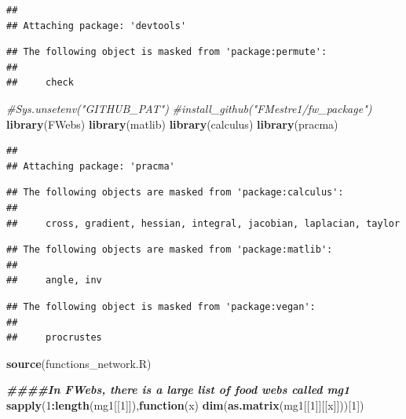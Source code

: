 \documentclass[
]{book}
\newenvironment{Shaded}{\begin{snugshade}}{\end{snugshade}}
\newcommand{\CommentTok}[1]{\textcolor[rgb]{0.56,0.35,0.01}{\textit{#1}}}
\newcommand{\ControlFlowTok}[1]{\textcolor[rgb]{0.13,0.29,0.53}{\textbf{#1}}}
\newcommand{\DecValTok}[1]{\textcolor[rgb]{0.00,0.00,0.81}{#1}}
\newcommand{\DocumentationTok}[1]{\textcolor[rgb]{0.56,0.35,0.01}{\textbf{\textit{#1}}}}
\newcommand{\FunctionTok}[1]{\textcolor[rgb]{0.13,0.29,0.53}{\textbf{#1}}}
\newcommand{\NormalTok}[1]{#1}
\newcommand{\SpecialCharTok}[1]{\textcolor[rgb]{0.81,0.36,0.00}{\textbf{#1}}}
\newcommand{\StringTok}[1]{\textcolor[rgb]{0.31,0.60,0.02}{#1}}
\theoremstyle{definition}
\theoremstyle{definition}
\theoremstyle{definition}
\theoremstyle{definition}
\theoremstyle{remark}
\begin{document}
\begin{verbatim}
## 
## Attaching package: 'devtools'
\end{verbatim}

\begin{verbatim}
## The following object is masked from 'package:permute':
## 
##     check
\end{verbatim}

\begin{Shaded}
\begin{Highlighting}[]
\CommentTok{\#Sys.unsetenv("GITHUB\_PAT")}
\CommentTok{\#install\_github("FMestre1/fw\_package")}
\FunctionTok{library}\NormalTok{(FWebs)}
\FunctionTok{library}\NormalTok{(matlib)}
\FunctionTok{library}\NormalTok{(calculus)}
\FunctionTok{library}\NormalTok{(pracma)}
\end{Highlighting}
\end{Shaded}

\begin{verbatim}
## 
## Attaching package: 'pracma'
\end{verbatim}

\begin{verbatim}
## The following objects are masked from 'package:calculus':
## 
##     cross, gradient, hessian, integral, jacobian, laplacian, taylor
\end{verbatim}

\begin{verbatim}
## The following objects are masked from 'package:matlib':
## 
##     angle, inv
\end{verbatim}

\begin{verbatim}
## The following object is masked from 'package:vegan':
## 
##     procrustes
\end{verbatim}

\begin{Shaded}
\begin{Highlighting}[]
\FunctionTok{source}\NormalTok{(}\StringTok{\textquotesingle{}functions\_network.R\textquotesingle{}}\NormalTok{)}

\DocumentationTok{\#\#\#\#In FWebs, there is a large list of food webs called mg1}
\FunctionTok{sapply}\NormalTok{(}\DecValTok{1}\SpecialCharTok{:}\FunctionTok{length}\NormalTok{(mg1[[}\DecValTok{1}\NormalTok{]]),}\ControlFlowTok{function}\NormalTok{(x) }\FunctionTok{dim}\NormalTok{(}\FunctionTok{as.matrix}\NormalTok{(mg1[[}\DecValTok{1}\NormalTok{]][[x]]))[}\DecValTok{1}\NormalTok{])}
\end{Highlighting}
\end{Shaded}
\end{document}
